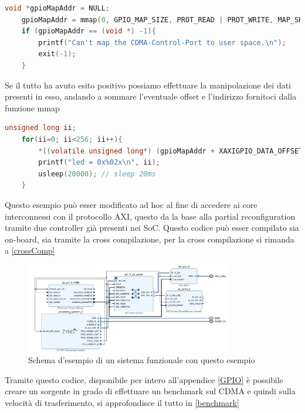\begin{lstlisting}[language=C, label=lst:C, caption={Mapping dell'indirizzo di GPIO}]
    void *gpioMapAddr = NULL;
    gpioMapAddr = mmap(0, GPIO_MAP_SIZE, PROT_READ | PROT_WRITE, MAP_SHARED, memfd, GPIO_BASE_ADDRESS);
    if (gpioMapAddr == (void *) -1){
        printf("Can't map the CDMA-Control-Port to user space.\n");
        exit(-1);
    }
\end{lstlisting}
Se il tutto ha avuto esito positivo possiamo effettuare la manipolazione dei dati presenti in esso, andando a sommare l'eventuale offset e l'indirizzo fornitoci dalla funzione mmap
\begin{lstlisting}[language=C, label=lst:C, caption={Esempio con un contatore tramite i led}]
    unsigned long ii;
    for(ii=0; ii<256; ii++){
        *((volatile unsigned long*) (gpioMapAddr + XAXIGPIO_DATA_OFFSET)) = ii;
        printf("led = 0x%02x\n", ii);
        usleep(20000); // sleep 20ms
    }
\end{lstlisting}
Questo esempio può esser modificato ad hoc al fine di accedere ai core interconnessi con il protocollo AXI, questo da la base alla partial reconfiguration tramite due controller già presenti nei SoC. Questo codice può esser compilato sia on-board, sia tramite la cross compilazione, per la cross compilazione si rimanda a \ref{crossComp}\clearpage
\begin{figure}
    \centering
    \includegraphics[width=0.8\textwidth]{images/Vivado1.jpg}
    \caption{Schema d'esempio di un sistema funzionale con questo esempio}
    \label{fig:my_label}
\end{figure}
Tramite questo codice, disponibile per intero all'appendice \ref{GPIO} è possibile creare un sorgente in grado di effettuare un benchmark sul CDMA e quindi sulla velocità di trasferimento, si approfondisce il tutto in \ref{benchmark}
